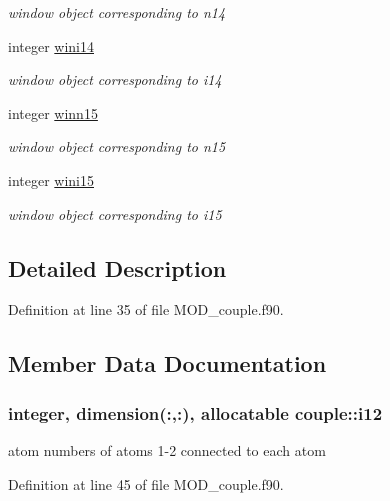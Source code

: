\begin{DoxyCompactItemize}
\begin{DoxyCompactList}\small\item\em window object corresponding to n14 \end{DoxyCompactList}\item 
integer \hyperlink{classcouple_a91dc2bff58d622bfa7ed6c3ed75914e0}{wini14}
\begin{DoxyCompactList}\small\item\em window object corresponding to i14 \end{DoxyCompactList}\item 
integer \hyperlink{classcouple_aa5f4412953b32839f1fe3000ab14125b}{winn15}
\begin{DoxyCompactList}\small\item\em window object corresponding to n15 \end{DoxyCompactList}\item 
integer \hyperlink{classcouple_a7d69f95f16d5d8a96cb1ba53d1a49c3a}{wini15}
\begin{DoxyCompactList}\small\item\em window object corresponding to i15 \end{DoxyCompactList}\end{DoxyCompactItemize}


\subsection{Detailed Description}


Definition at line 35 of file M\-O\-D\-\_\-couple.\-f90.



\subsection{Member Data Documentation}
\hypertarget{classcouple_aadf31ce6a0e91d1f81d2eafb838e8cd9}{
\subsubsection[{i12}]{\setlength{\rightskip}{0pt plus 5cm}integer, dimension(\-:,\-:), allocatable couple\-::i12}}\label{classcouple_aadf31ce6a0e91d1f81d2eafb838e8cd9}


atom numbers of atoms 1-\/2 connected to each atom 



Definition at line 45 of file M\-O\-D\-\_\-couple.\-f90.

